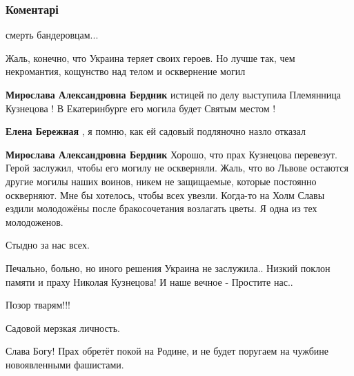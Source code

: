  
 
 
 
 
\subsubsection{Коментарі}

\begin{itemize} %
смерть бандеровцам...


Жаль, конечно, что Украина теряет своих героев. Но лучше так, чем некромантия,
кощунство над телом и осквернение могил

\begin{itemize} %
\textbf{Мирослава Александровна Бердник} истицей по делу выступила Племянница Кузнецова ! В Екатеринбурге его могила будет Святым местом !

\textbf{Елена Бережная} , я помню, как ей садовый подляночно назло отказал

\textbf{Мирослава Александровна Бердник} Хорошо, что прах Кузнецова перевезут. Герой заслужил, чтобы его могилу не оскверняли. Жаль, что во Львове остаются другие могилы наших воинов, никем не защищаемые, которые постоянно оскверняют. Мне бы хотелось, чтобы всех увезли.
Когда-то на Холм
Славы ездили молодожёны после бракосочетания возлагать цветы. Я одна из тех молодоженов.
\end{itemize} %

Стыдно за нас всех.


Печально, больно, но иного решения Украина не заслужила.. Низкий поклон памяти
и праху Николая Кузнецова! И наше вечное - Простите нас..

Позор тварям!!!

Садовой мерзкая личность.

Слава Богу! Прах обретёт покой на Родине, и не будет поругаем на чужбине новоявленными фашистами.


\end{itemize}
